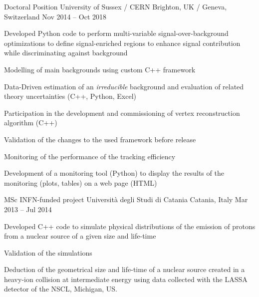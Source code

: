   \begin{cventries}    
    \cventry
    {Doctoral Position}
    {University of Sussex / CERN}
    {Brighton, UK / Geneva, Switzerland}
    {Nov 2014 -- Oct 2018}
    {
    \begin{cvitems}
      \item Developed Python code to perform multi-variable signal-over-background optimizations to define signal-enriched regions to enhance signal contribution while discriminating against background
      \item Modelling of main backgrounds using custom C++ framework
      \item Data-Driven estimation of an \emph{irreducible} background and evaluation of related theory uncertainties (C++, Python, Excel)
      \item Participation in the development and commissioning of vertex reconstruction algorithm (C++)
      \item Validation of the changes to the used framework before release
      \item Monitoring of the performance of the tracking efficiency
      \item Development of a monitoring tool (Python) to display the results of the monitoring (plots, tables) on a web page (HTML)
    \end{cvitems}
    }
  \end{cventries}

  \begin{cventries}    
    \cventry
    {MSc INFN-funded project}
    {Università degli Studi di Catania}
    {Catania, Italy}
    {Mar 2013 -- Jul 2014}
    {
    \begin{cvitems}
      \item Developed C++ code to simulate physical distributions of the emission of protons from a nuclear source of a given size and life-time
      \item Validation of the simulations
      \item Deduction of the geometrical size and life-time of a nuclear source created in a heavy-ion collision at intermediate energy using data collected with the LASSA detector of the NSCL, Michigan, US.
    \end{cvitems}
    }
  \end{cventries}
